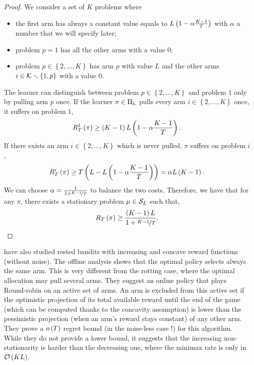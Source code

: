 \begin{proof}
We consider a set of $K$ problems where 
\begin{itemize}
\item the first arm has always a constant value equals to $L\left(1- \alpha\frac{K-1}{T}\right)$ with $\alpha$ a number that we will specify later;
\item problem $p =1$ has all the other arms with a value $0$;
\item problem $p \in \left\lbrace 2, \dots, K \right\rbrace$ has arm $p$ with value $L$ and the other arms $i\in \mathcal{K} \smallsetminus \left\lbrace 1, p\right\rbrace$ with a value $0$.
\end{itemize}
The learner can distinguish between problem $p \in \left\lbrace 2, \dots, K \right\rbrace$ and problem $1$ only by pulling arm $p$ once. If the learner $\pi \in \Pi_{\rm L}$ pulls every arm $i \in \left\lbrace 2, \dots, K \right\rbrace$ once, it suffers on problem $1$,
\[R_T^1\left(\pi\right) \geq \left(K-1\right)L\left(1- \alpha\frac{K-1}{T}\right).\]
If there exists an arm $i \in \left\lbrace 2, \dots, K \right\rbrace$ which is never pulled, $\pi$ suffers on problem $i$,
\[R_T^i\left(\pi\right) \geq T \left(L - L\left(1- \alpha\frac{K-1}{T}\right)\right)= \alpha L\left(K-1\right).\]
We can choose $\alpha = \frac{1}{1+ \nicefrac{K-1}{T}}$ to balance the two costs. Therefore, we have that for any $\pi$, there exists a stationary problem $\mu \in \mathcal{S}_L$ such that,
\[R_T\left(\pi\right) \geq \frac{\left(K-1\right)L}{1+ \nicefrac{K-1}{T}}.\]
\end{proof} 
\begin{remark}
\citet{heidari2016tight} have also studied rested bandits with increasing and concave reward functions (without noise). The offline analysis shows that the optimal policy selects always the same arm. This is very different from the rotting case, where the optimal allocation may pull several arms. They suggest an online policy that plays Round-robin on an active set of arms. An arm is excluded from this active set if the optimistic projection of its total available reward until the end of the game (which can be computed thanks to the concavity assumption) is lower than the pessimistic projection (when an arm's reward stays constant) of any other arm. They prove a $o\left(T\right)$ regret bound (in the noise-less case !) for this algorithm. While they do not provide a lower bound, it suggests that the increasing non-stationarity is harder than the decreasing one, where the minimax rate is only in $\mathcal{O}\left(KL\right)$.
\end{remark}

